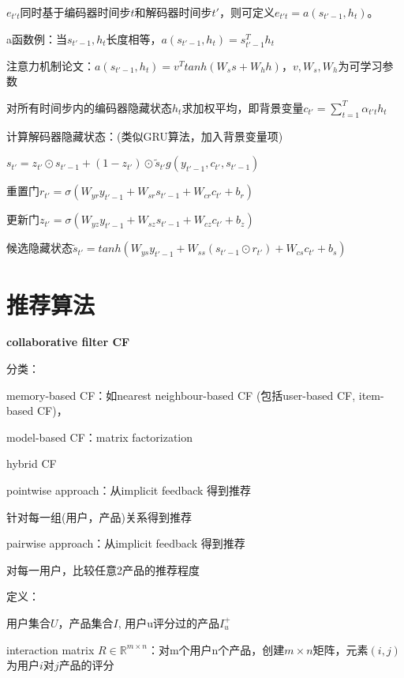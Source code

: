 \documentclass[UTF8]{ctexart}
\begin{document}
  \quad \quad $e_{t't}$同时基于编码器时间步$t$和解码器时间步$t'$，则可定义$e_{t't} = a(s_{t'-1}, h_t)$。

  \quad \quad \quad a函数例：当$s_{t'-1}, h_t$长度相等，$a(s_{t'-1}, h_t) = s_{t'-1}^Th_t$

  \quad \quad \quad 注意力机制论文：$a(s_{t'-1}, h_t) = v^Ttanh(W_ss + W_hh)$，$v, W_s, W_h$为可学习参数

  \quad 对所有时间步内的编码器隐藏状态$h_t$求加权平均，即背景变量$c_{t'} = \sum_{t=1}^{T}\alpha_{t't}h_t$

  计算解码器隐藏状态：(类似GRU算法，加入背景变量项)
  
  \quad $s_{t'} = z_{t'} \odot s_{t'-1} + (1-z_{t'}) \odot \tilde{s}_{t'}g(y_{t'-1}, c_{t'}, s_{t'-1})$

  \quad \quad 重置门$r_{t'} = \sigma(W_{yr}y_{t'-1} + W_{sr}s_{t'-1} + W_{cr}c_{t'} + b_r)$
  
  \quad \quad 更新门$z_{t'} = \sigma(W_{yz}y_{t'-1} + W_{sz}s_{t'-1} + W_{cz}c_{t'} + b_z)$

  \quad \quad 候选隐藏状态$\tilde{s}_{t'} = tanh(W_{ys}y_{t'-1} + W_{ss}(s_{t'-1} \odot r_{t'}) + W_{cs}c_{t'} + b_s)$

\section{推荐算法}
\noindent \textbf{collaborative filter CF}

  分类：
  
  \quad memory-based CF：如nearest neighbour-based CF (包括user-based CF, item-based CF)，
  
  \quad model-based CF：matrix factorization 
  
  \quad hybrid CF

  \quad pointwise approach：从implicit feedback 得到推荐

  \quad \quad 针对每一组(用户，产品)关系得到推荐

  \quad pairwise approach：从implicit feedback 得到推荐

  \quad \quad 对每一用户，比较任意2产品的推荐程度

  定义：

  \quad 用户集合$U$，产品集合$I$, 用户u评分过的产品$I_u^+$

  \quad interaction matrix $R \in \mathbb{R}^{m \times n}$：对m个用户n个产品，创建$m \times n$矩阵，元素$(i, j)$为用户$i$对$j$产品的评分
\end{document}
